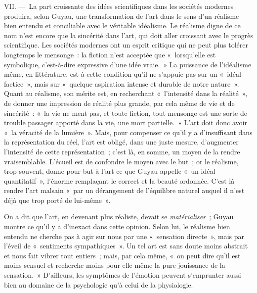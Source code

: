 \documentclass[french,twoside]{book} %
\begin{document}
VII. — La part croissante des idées scientifiques dans les sociétés modernes produira, selon Guyau, une transformation de l’art dans le sens d’un réalisme bien entendu et conciliable avec le véritable idéalisme. Le réalisme digne de ce nom n’est encore que la sincérité dans l’art, qui doit aller croissant avec le progrès scientifique. Les sociétés modernes ont un esprit critique qui ne peut plus tolérer longtemps le mensonge : la fiction n’est acceptée que « lorsqu’elle est symbolique, c’est-à-dire expressive d’une idée vraie. » La puissance de l’idéalisme même, en littérature, est à cette condition qu’il ne s’appuie pas sur un « idéal factice », mais sur « quelque aspiration intense et durable de notre nature ». Quant au réalisme, son mérite est, en recherchant « l’intensité dans la réalité », de donner une impression de réalité plus grande, par cela même de vie et de sincérité : « la vie ne ment pas, et toute fiction, tout mensonge est une sorte de trouble passager apporté dans la vie, une mort partielle. » L’art doit donc avoir « la véracité de la lumière ». Mais, pour compenser ce qu’il y a d’insuffisant dans la représentation du réel, l’art est obligé, dans une juste mesure, d’augmenter l’intensité de cette représentation ; c’est là, en somme, un moyen de la rendre vraisemblable. L’écueil est de confondre le moyen avec le but ; or le réalisme, trop souvent, donne pour but à l’art ce que Guyau appelle « un idéal quantitatif », l’énorme remplaçant le correct et la beauté ordonnée. C’est là rendre l’art malsain « par un dérangement de l’équilibre naturel auquel il n’est déjà que trop porté de lui-même ».\par
On a dit que l’art, en devenant plus réaliste, devait se \emph{matérialiser} ; Guyau montre ce qu’il y a d’inexact dans cette opinion. Selon lui, le réalisme bien entendu ne cherche pas à agir sur nous par une « sensation directe », mais par l’éveil de « sentiments sympathiques ». Un tel art est sans doute moins abstrait et nous fait vibrer tout entiers ; mais, par cela même, « on peut dire qu’il est moins sensuel et recherche moins pour elle-même la pure jouissance de la sensation. » D’ailleurs, les symptômes de l’émotion peuvent s’emprunter aussi bien au domaine de la psychologie qu’à celui de la physiologie.\par
\end{document}
